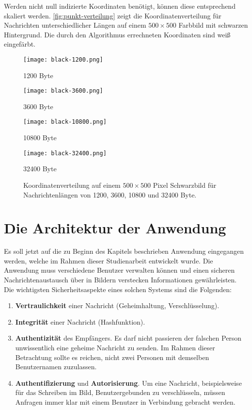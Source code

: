 \noindent
Werden nicht null indizierte Koordinaten benötigt, können diese entsprechend skaliert werden.
\autoref{fig:punkt-verteilung} zeigt die Koordinatenverteilung für Nachrichten unterschiedlicher
Längen auf einem $500 \times 500$ Farbbild mit schwarzen Hintergrund. Die durch den Algorithmus
errechneten Koordinaten sind weiß eingefärbt.
\begin{figure}
  \centering
  \begin{minipage}[t]{0.45\textwidth}
    \texttt{[image: black-1200.png]}
    \caption*{1200 Byte}
  \end{minipage}
  \hfill
  \begin{minipage}[t]{0.45\textwidth}
    \texttt{[image: black-3600.png]}
    \caption*{3600 Byte}
  \end{minipage}%
  \vspace{0.5cm}
  \begin{minipage}[t]{0.45\textwidth}
    \texttt{[image: black-10800.png]}
    \caption*{10800 Byte}
  \end{minipage}
  \hfill
  \begin{minipage}[t]{0.45\textwidth}
    \texttt{[image: black-32400.png]}
    \caption*{32400 Byte}
  \end{minipage}
  \caption{Koordinatenverteilung auf einem $500 \times 500$ Pixel Schwarzbild für Nachrichtenlängen von 1200, 3600, 10800 und 32400 Byte.}
  \label{fig:punkt-verteilung}
\end{figure}

\newpage
\section{Die Architektur der Anwendung}
Es soll jetzt auf die zu Beginn des Kapitels beschrieben Anwendung
eingegangen werden, welche im Rahmen dieser Studienarbeit entwickelt wurde.
Die Anwendung muss verschiedene Benutzer verwalten können und
einen sicheren Nachrichtenaustausch über in Bildern
verstecken Informationen gewährleisten.
Die wichtigsten Sicherheitsaspekte eines
solchen Systems sind die Folgenden:
\begin{enumerate}
  \item \textbf{Vertraulichkeit} einer Nachricht (Geheimhaltung, Verschlüsselung).
  \item \textbf{Integrität} einer Nachricht (Hashfunktion).
  \item \textbf{Authentizität} des Empfängers. Es darf nicht passieren der falschen Person
        unwissentlich eine geheime Nachricht zu senden. Im Rahmen dieser Betrachtung sollte
        es reichen, nicht zwei Personen mit demselben Benutzernamen zuzulassen.
  \item \textbf{Authentifizierung} und \textbf{Autorisierung}. Um eine Nachricht, beispielsweise für das Schreiben
        im Bild, Benutzergebunden zu verschlüsseln,
        müssen Anfragen immer klar mit einem Benutzer in Verbindung gebracht werden.
\end{enumerate}

